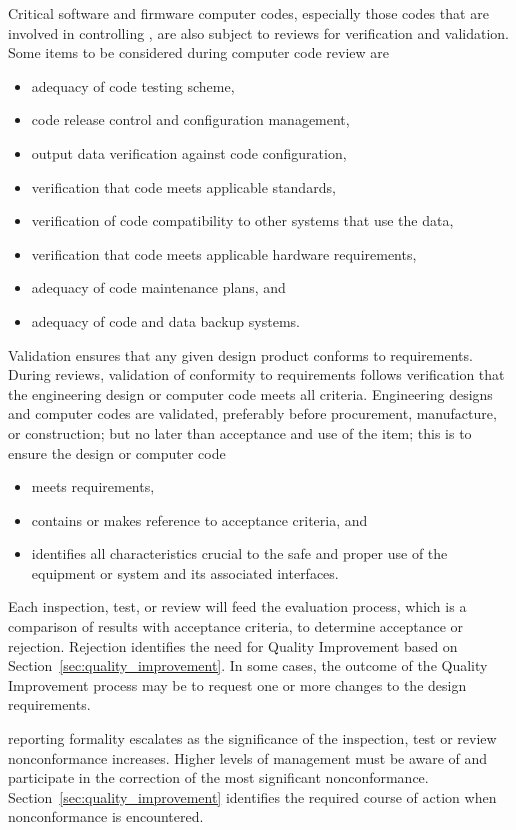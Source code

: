 Critical software and firmware computer codes, especially those codes
that are involved in controlling  , are also subject to reviews for verification and
validation. Some items to be considered during computer code review
are
\begin{itemize}
\item adequacy of code testing scheme,
\item code release control and configuration management,
  \item output data verification against code configuration,
  \item verification that code meets applicable standards, 
  \item verification of code compatibility to other systems that use
    the data,
  \item verification that code meets applicable hardware requirements,
  \item adequacy of code maintenance plans, and
  \item adequacy of code and data backup systems.
\end{itemize}

Validation ensures that any given design product conforms to 
requirements.
During reviews, validation of conformity to requirements
follows verification that the engineering design or computer code
meets all criteria. Engineering designs and computer codes are
validated, preferably before procurement, manufacture, or
construction; but no later than acceptance and use of the item; this
is to ensure the design or computer code
\begin{itemize}
 \item meets  requirements,
 \item contains or makes reference to acceptance criteria, and
 \item identifies all characteristics crucial to the safe and proper
   use of the equipment or system and its associated interfaces.
\end{itemize}

Each inspection, test, or review will feed the  evaluation
process, which is a comparison of results with acceptance criteria, to
determine acceptance or rejection. Rejection identifies the need for
Quality Improvement based on Section~\ref{sec:quality_improvement}. In
some cases, the outcome of the Quality Improvement process may be to
request one or more changes to the design requirements.

 reporting formality escalates as the significance of the
inspection, test or review nonconformance increases. Higher levels of
management must be aware of and participate in the correction of the
most significant nonconformance. Section~\ref{sec:quality_improvement}
identifies the required course of action when nonconformance is
encountered.

